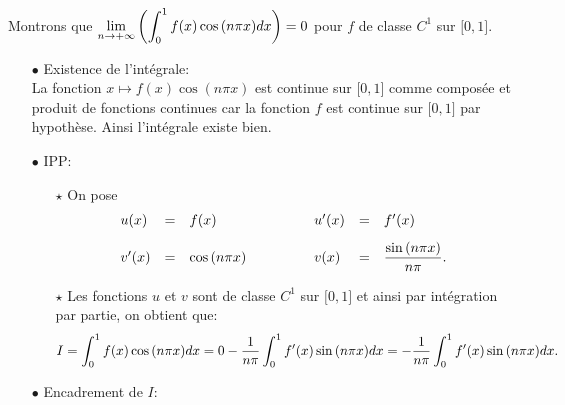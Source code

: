 \documentclass[a4paper, 11pt,reqno]{article}
\begin{document}
\begin{correction}\;
	Montrons que $ \displaystyle \lim\limits_{n\to +\infty} \left( \int_0^1 f(x)\cos{(n\pi x)}dx \right)=0$ pour $f$ de classe $C^1$ sur $\lbrack 0,1\rbrack$.%
	\begin{itemize}
		\item[$\bullet$] Existence de l'int\'egrale:\\
		      \noindent La fonction $x\mapsto f(x)\cos{(n\pi x)}$ est continue sur $\lbrack 0,1\rbrack$ comme compos\'ee et produit de fonctions continues car la fonction $f$ est continue sur $\lbrack 0,1\rbrack$ par hypoth\`{e}se. Ainsi l'int\'egrale existe bien.
		\item[$\bullet$] IPP:
		      \begin{itemize}
			      \item[$\star$] On pose
			            $$\begin{array}{lllllll}
					            u(x)          & = & f(x)           & \hspace{1cm} & u^{\prime}(x) & = & f^{\prime}(x)\vsec                \\
					            v^{\prime}(x) & = & \cos{(n\pi x)} & \hspace{1cm} & v(x)          & = & \ddp\frac{\sin{(n\pi x)}}{n\pi }.
				            \end{array}$$
			      \item[$\star$] Les fonctions $u$ et $v$ sont de classe $C^1$ sur $\lbrack 0,1\rbrack$ et ainsi par int\'egration par partie, on obtient que:
			            $$I=\int_0^1 f(x)\cos{(n\pi x)} dx = 0-\displaystyle\frac{1}{n\pi } \int_0^1 f^{\prime}(x)\sin{(n\pi x)}dx = -\displaystyle\frac{1}{n\pi } \int_0^1 f^{\prime}(x)\sin{(n\pi x)}dx.$$
		      \end{itemize}
		\item[$\bullet$] Encadrement de $I$:

\end{itemize}
\end{correction}
\end{document}
